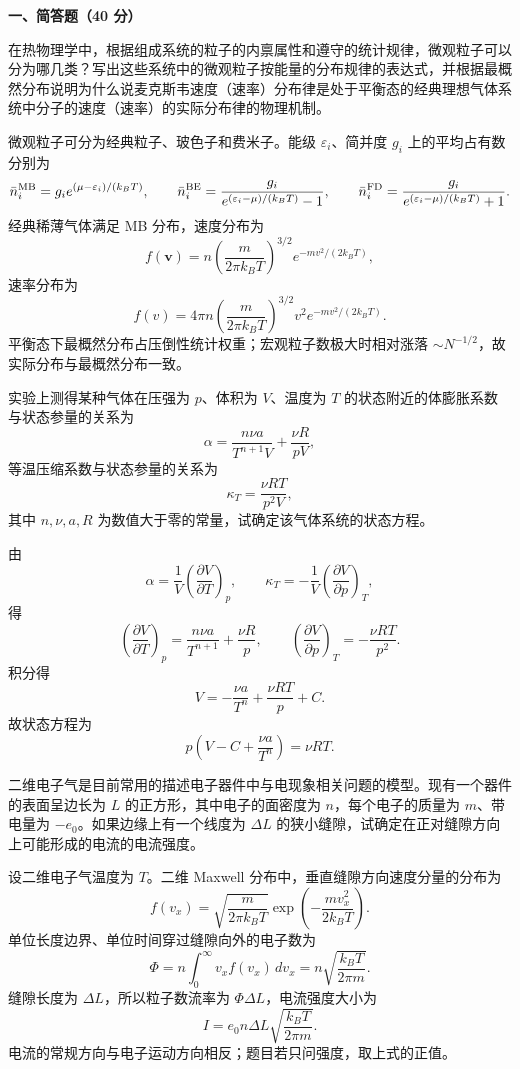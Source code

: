 ﻿

\textbf{一、简答题（40 分）}

\begin{question}
在热物理学中，根据组成系统的粒子的内禀属性和遵守的统计规律，微观粒子可以分为哪几类？写出这些系统中的微观粒子按能量的分布规律的表达式，并根据最概然分布说明为什么说麦克斯韦速度（速率）分布律是处于平衡态的经典理想气体系统中分子的速度（速率）的实际分布律的物理机制。
\begin{solution}
微观粒子可分为经典粒子、玻色子和费米子。能级 $\varepsilon_i$、简并度 $g_i$ 上的平均占有数分别为
\[
\bar n_i^{\rm MB}=g_i e^{(\mu-\varepsilon_i)/(k_BT)},\qquad
\bar n_i^{\rm BE}=\frac{g_i}{e^{(\varepsilon_i-\mu)/(k_BT)}-1},\qquad
\bar n_i^{\rm FD}=\frac{g_i}{e^{(\varepsilon_i-\mu)/(k_BT)}+1}.
\]
经典稀薄气体满足 MB 分布，速度分布为
\[
f(\mathbf v)=n\left(\frac{m}{2\pi k_BT}\right)^{3/2}e^{-mv^2/(2k_BT)},
\]
速率分布为
\[
f(v)=4\pi n\left(\frac{m}{2\pi k_BT}\right)^{3/2}v^2e^{-mv^2/(2k_BT)}.
\]
平衡态下最概然分布占压倒性统计权重；宏观粒子数极大时相对涨落 $\sim N^{-1/2}$，故实际分布与最概然分布一致。
\end{solution}
\end{question}

\begin{question}
实验上测得某种气体在压强为 $p$、体积为 $V$、温度为 $T$ 的状态附近的体膨胀系数与状态参量的关系为
\[
\alpha=\frac{n\nu a}{T^{n+1}V}+\frac{\nu R}{pV},
\]
等温压缩系数与状态参量的关系为
\[
\kappa_T=\frac{\nu RT}{p^2V},
\]
其中 $n,\nu,a,R$ 为数值大于零的常量，试确定该气体系统的状态方程。
\begin{solution}
由
\[
\alpha=\frac1V\left(\frac{\partial V}{\partial T}\right)_p,
\qquad
\kappa_T=-\frac1V\left(\frac{\partial V}{\partial p}\right)_T,
\]
得
\[
\left(\frac{\partial V}{\partial T}\right)_p
=\frac{n\nu a}{T^{n+1}}+\frac{\nu R}{p},
\qquad
\left(\frac{\partial V}{\partial p}\right)_T
=-\frac{\nu RT}{p^2}.
\]
积分得
\[
V=-\frac{\nu a}{T^n}+\frac{\nu RT}{p}+C.
\]
故状态方程为
\[
p\left(V-C+\frac{\nu a}{T^n}\right)=\nu RT.
\]
\end{solution}
\end{question}

\begin{question}
二维电子气是目前常用的描述电子器件中与电现象相关问题的模型。现有一个器件的表面呈边长为 $L$ 的正方形，其中电子的面密度为 $n$，每个电子的质量为 $m$、带电量为 $-e_0$。如果边缘上有一个线度为 $\Delta L$ 的狭小缝隙，试确定在正对缝隙方向上可能形成的电流的电流强度。
\begin{solution}
设二维电子气温度为 $T$。二维 Maxwell 分布中，垂直缝隙方向速度分量的分布为
\[
f(v_x)=\sqrt{\frac{m}{2\pi k_BT}}\exp\left(-\frac{mv_x^2}{2k_BT}\right).
\]
单位长度边界、单位时间穿过缝隙向外的电子数为
\[
\Phi=n\int_0^\infty v_x f(v_x)\,dv_x
=n\sqrt{\frac{k_BT}{2\pi m}}.
\]
缝隙长度为 $\Delta L$，所以粒子数流率为 $\Phi\Delta L$，电流强度大小为
\[
I=e_0 n\Delta L\sqrt{\frac{k_BT}{2\pi m}}.
\]
电流的常规方向与电子运动方向相反；题目若只问强度，取上式的正值。
\end{solution}
\end{question}

